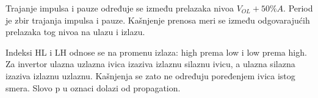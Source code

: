 Trajanje impulsa i pauze određuje se između prelazaka nivoa $V_{OL}+50\%A$. Period je zbir trajanja impulsa i pauze. Kašnjenje prenosa meri se između odgovarajućih prelazaka tog nivoa na ulazu i izlazu.

Indeksi HL i LH odnose se na promenu izlaza: high prema low i low prema high. Za invertor ulazna uzlazna ivica izaziva izlaznu silaznu ivicu, a ulazna silazna izaziva izlaznu uzlaznu. Kašnjenja se zato ne određuju poređenjem ivica istog smera. Slovo p u oznaci dolazi od propagation.
